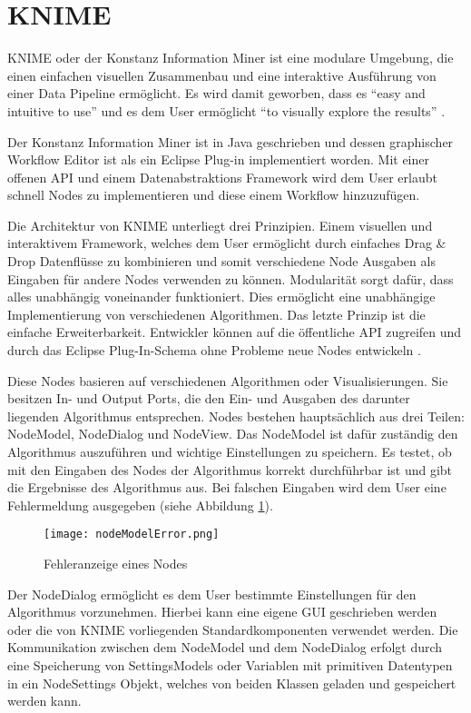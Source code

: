 {\section{KNIME}
\label{ch:Grundlagen:sec:knime}
KNIME oder der Konstanz Information Miner ist eine modulare Umgebung, die einen einfachen visuellen Zusammenbau und eine interaktive Ausführung von einer Data Pipeline ermöglicht. Es wird damit geworben, dass es \enquote{easy and intuitive to use} und es dem User ermöglicht \enquote{to visually explore the results} \cite[p. 2]{BCDG+07}.

Der Konstanz Information Miner ist in Java geschrieben und dessen graphischer Workflow Editor ist als ein Eclipse Plug-in implementiert worden. Mit einer offenen API und einem Datenabstraktions Framework wird dem User erlaubt schnell Nodes zu implementieren und diese einem Workflow hinzuzufügen.

Die Architektur von KNIME unterliegt drei Prinzipien. Einem visuellen und interaktivem Framework, welches dem User ermöglicht durch einfaches Drag \& Drop Datenflüsse zu kombinieren und somit verschiedene Node Ausgaben als Eingaben für andere Nodes verwenden zu können. Modularität sorgt dafür, dass alles unabhängig voneinander funktioniert. Dies ermöglicht eine unabhängige Implementierung von verschiedenen Algorithmen. Das letzte Prinzip ist die einfache Erweiterbarkeit. Entwickler können auf die öffentliche API zugreifen und durch das Eclipse Plug-In-Schema ohne Probleme neue Nodes entwickeln \cite{BCDG+07}.

Diese Nodes basieren auf verschiedenen Algorithmen oder Visualisierungen. Sie besitzen In- und Output Ports, die den Ein- und Ausgaben des darunter liegenden Algorithmus entsprechen. Nodes bestehen hauptsächlich aus drei Teilen: NodeModel, NodeDialog und NodeView. Das NodeModel ist dafür zuständig den Algorithmus auszuführen und wichtige Einstellungen zu speichern. Es testet, ob mit den Eingaben des Nodes der Algorithmus korrekt durchführbar ist und gibt die Ergebnisse des Algorithmus aus. Bei falschen Eingaben wird dem User eine Fehlermeldung ausgegeben (siehe Abbildung \ref{img:nodeModelError}).

\begin{figure}[H]
	\centering
	\texttt{[image: nodeModelError.png]}
	\caption{Fehleranzeige eines Nodes}
	\label{img:nodeModelError}
\end{figure}

Der NodeDialog ermöglicht es dem User bestimmte Einstellungen für den Algorithmus vorzunehmen. Hierbei kann eine eigene GUI geschrieben werden oder die von KNIME vorliegenden Standardkomponenten verwendet werden. Die Kommunikation zwischen dem NodeModel und dem NodeDialog erfolgt durch eine Speicherung von SettingsModels oder Variablen mit primitiven Datentypen in ein NodeSettings Objekt, welches von beiden Klassen geladen und gespeichert werden kann. 

}
